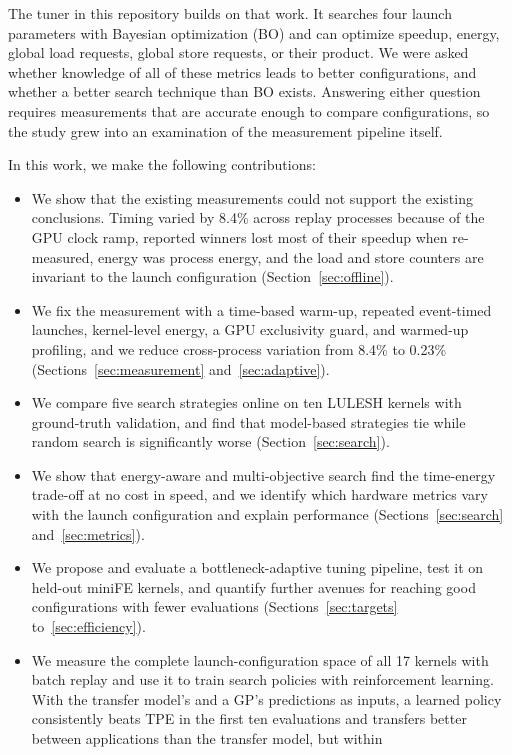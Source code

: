 \documentclass[10pt]{article}
\begin{document}
The tuner in this repository builds on that work. It searches four launch
parameters with Bayesian optimization (BO) and can optimize speedup, energy,
global load requests, global store requests, or their product. We were asked
whether knowledge of all of these metrics leads to better configurations,
and whether a better search technique than BO exists. Answering either
question requires measurements that are accurate enough to compare
configurations, so the study grew into an examination of the measurement
pipeline itself.

In this work, we make the following contributions:
\begin{itemize}
\item We show that the existing measurements could not support the existing
  conclusions. Timing varied by 8.4\% across replay processes because of the
  GPU clock ramp, reported winners lost most of their speedup when
  re-measured, energy was process energy, and the load and store counters
  are invariant to the launch configuration (Section~\ref{sec:offline}).
\item We fix the measurement with a time-based warm-up, repeated
  event-timed launches, kernel-level energy, a GPU exclusivity guard, and
  warmed-up profiling, and we reduce cross-process variation from 8.4\% to
  0.23\% (Sections~\ref{sec:measurement} and~\ref{sec:adaptive}).
\item We compare five search strategies online on ten LULESH kernels with
  ground-truth validation, and find that model-based strategies tie while
  random search is significantly worse (Section~\ref{sec:search}).
\item We show that energy-aware and multi-objective search find the
  time-energy trade-off at no cost in speed, and we identify which hardware
  metrics vary with the launch configuration and explain performance
  (Sections~\ref{sec:search} and~\ref{sec:metrics}).
\item We propose and evaluate a bottleneck-adaptive tuning pipeline, test it
  on held-out miniFE kernels, and quantify further avenues for reaching good
  configurations with fewer evaluations
  (Sections~\ref{sec:targets} to~\ref{sec:efficiency}).
\item We measure the complete launch-configuration space of all 17 kernels
  with batch replay and use it to train search policies with reinforcement
  learning. With the transfer model's and a GP's predictions as inputs, a
  learned policy consistently beats TPE in the first ten evaluations and
  transfers better between applications than the transfer model, but within

\end{itemize}
\end{document}
